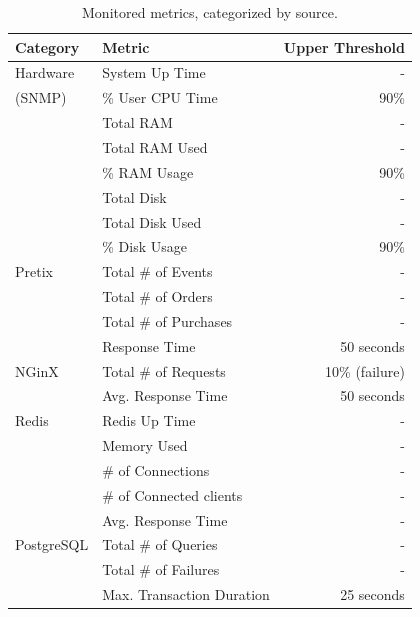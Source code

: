 \documentclass[12pt]{article}
\begin{document}
\begin{table}[H]
  \begin{center}
    \begin{tabular}{l|l|r}
      \hline
      \textbf{Category} & \textbf{Metric}           & \textbf{Upper Threshold} \\
      \hline
      Hardware          & System Up Time            & -                        \\
      (SNMP)            & \% User CPU Time          & 90\%                     \\
                        & Total RAM                 & -                        \\
                        & Total RAM Used            & -                        \\
                        & \% RAM Usage              & 90\%                     \\
                        & Total Disk                & -                        \\
                        & Total Disk Used           & -                        \\
                        & \% Disk Usage             & 90\%                     \\
      \hline
      Pretix            & Total \# of Events        & -                        \\
                        & Total \# of Orders        & -                        \\
                        & Total \# of Purchases     & -                        \\
                        & Response Time             & 50 seconds               \\
      \hline
      NGinX             & Total \# of Requests      & 10\% (failure)           \\
                        & Avg. Response Time        & 50 seconds               \\
      \hline
      Redis             & Redis Up Time             & -                        \\
                        & Memory Used               & -                        \\
                        & \# of Connections         & -                        \\
                        & \# of Connected clients   & -                        \\
                        & Avg. Response Time        & -                        \\
      \hline
      PostgreSQL        & Total \# of Queries       & -                        \\
                        & Total \# of Failures      & -                        \\
                        & Max. Transaction Duration & 25 seconds               \\
      \hline
    \end{tabular}
    \caption{Monitored metrics, categorized by source.}
    \label{tab:sla}
  \end{center}
\end{table}
\end{document}
